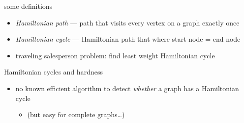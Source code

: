 \begin{frame}{some definitions}
\begin{itemize}
\item \textit{Hamiltonian path} --- path that visits every vertex on a graph exactly once
\item \textit{Hamiltonian cycle} --- Hamiltonian path that where start node = end node
\vspace{.5cm}
\item traveling salesperson problem: find least weight Hamiltonian cycle
\end{itemize}
\end{frame}

\begin{frame}{Hamiltonian cycles and hardness}
\begin{itemize}
\item no known efficient algorithm to detect \textit{whether} a graph has a Hamiltonian cycle
    \begin{itemize}
    \item (but easy for complete graphs\ldots)
    \end{itemize}
\end{itemize}
\end{frame}
